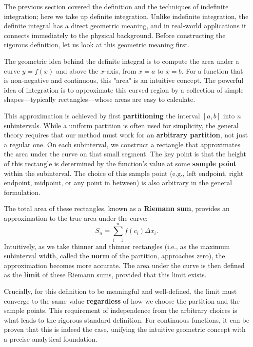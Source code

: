 The previous section covered the definition and the techniques of indefinite integration; here we take up definite integration. Unlike indefinite integration, the definite integral has a direct geometric meaning, and in real-world applications it connects immediately to the physical background. Before constructing the rigorous definition, let us look at this geometric meaning first.

The geometric idea behind the definite integral is to compute the area under a curve \( y = f(x) \) and above the \( x \)-axis, from \( x = a \) to \( x = b \). For a function that is non-negative and continuous, this "area" is an intuitive concept. The powerful idea of integration is to approximate this curved region by a collection of simple shapes—typically rectangles—whose areas are easy to calculate.

This approximation is achieved by first \textbf{partitioning} the interval \([a, b]\) into \( n \) subintervals. While a uniform partition is often used for simplicity, the general theory requires that our method must work for an \textbf{arbitrary partition}, not just a regular one. On each subinterval, we construct a rectangle that approximates the area under the curve on that small segment. The key point is that the height of this rectangle is determined by the function's value at some \textbf{sample point} within the subinterval. The choice of this sample point (e.g., left endpoint, right endpoint, midpoint, or any point in between) is also arbitrary in the general formulation.

The total area of these rectangles, known as a \textbf{Riemann sum}, provides an approximation to the true area under the curve:
\[
S_n = \sum_{i=1}^n f(c_i) \Delta x_i.
\]
Intuitively, as we take thinner and thinner rectangles (i.e., as the maximum subinterval width, called the \textbf{norm} of the partition, approaches zero), the approximation becomes more accurate. The area under the curve is then defined as the \textbf{limit} of these Riemann sums, provided that this limit exists.

Crucially, for this definition to be meaningful and well-defined, the limit must converge to the same value \textbf{regardless} of how we choose the partition and the sample points. This requirement of independence from the arbitrary choices is what leads to the rigorous standard definition. For continuous functions, it can be proven that this is indeed the case, unifying the intuitive geometric concept with a precise analytical foundation.


